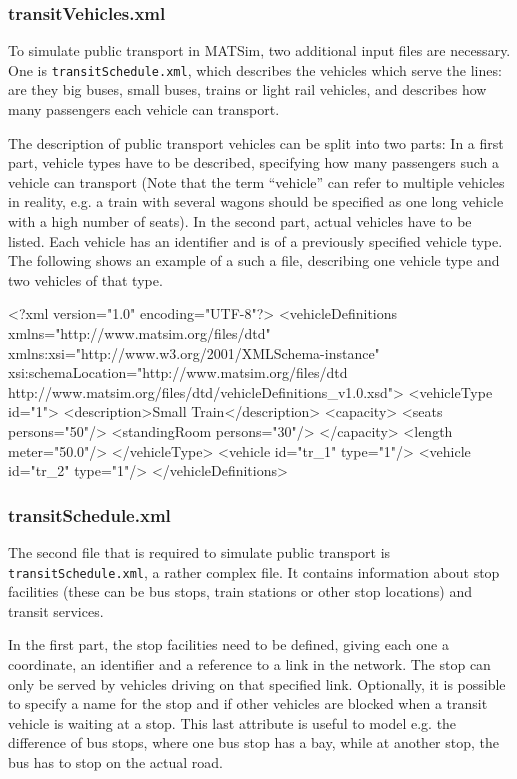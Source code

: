 \subsubsection{transitVehicles.xml}
To simulate public transport in MATSim, two additional input files are necessary. One is \lstinline|transitSchedule.xml|, which describes the vehicles which serve the lines: are they big buses, small buses, trains or light rail vehicles, and describes how many passengers each vehicle can transport.

The description of public transport vehicles can be split into two parts: In a first part, vehicle types have to be described, specifying how many passengers such a vehicle can transport (Note that the term ``vehicle'' can refer to multiple vehicles in reality, e.g. a train with several wagons should be specified as one long vehicle with a high number of seats). In the second part, actual vehicles have to be listed. Each vehicle has an identifier and is of a previously specified vehicle type. The following shows an example of a such a file, describing one vehicle type and two vehicles of that type. 

\begin{xml}
<?xml version="1.0" encoding="UTF-8"?> 
<vehicleDefinitions xmlns="http://www.matsim.org/files/dtd" 
       xmlns:xsi="http://www.w3.org/2001/XMLSchema-instance" 
       xsi:schemaLocation="http://www.matsim.org/files/dtd 
                     http://www.matsim.org/files/dtd/vehicleDefinitions_v1.0.xsd"> 
	<vehicleType id="1"> 
      <description>Small Train</description> 
      <capacity> 
         <seats persons="50"/> 
         <standingRoom persons="30"/> 
      </capacity> 
      <length meter="50.0"/> 
   </vehicleType> 
   <vehicle id="tr_1" type="1"/> 
   <vehicle id="tr_2" type="1"/> 
</vehicleDefinitions>
\end{xml}

\subsubsection{transitSchedule.xml}
The second file that is required to simulate public transport is \lstinline|transitSchedule.xml|, a rather complex file. It contains information about stop facilities (these can be bus stops, train stations or other stop locations) and transit services.

In the first part, the stop facilities need to be defined, giving each one a coordinate, an identifier and a reference to a link in the network. The stop can only be served by vehicles driving on that specified link. Optionally, it is possible to specify a name for the stop and if other vehicles are blocked when a transit vehicle is waiting at a stop. This last attribute is useful to model e.g. the difference of bus stops, where one bus stop has a bay, while at another stop, the bus has to stop on the actual road.

